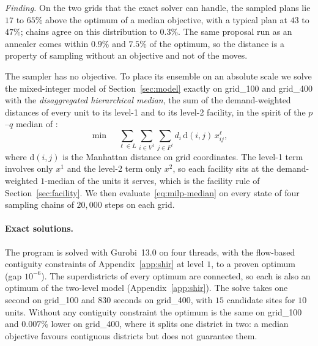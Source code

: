 \emph{Finding.} On the two grids that the exact solver can handle, the sampled plans lie $17$ to $65\%$ above the optimum of a median objective, with a typical plan at $43$ to $47\%$; chains agree on this distribution to $0.3\%$. The same proposal run as an annealer comes within $0.9\%$ and $7.5\%$ of the optimum, so the distance is a property of sampling without an objective and not of the moves.

The sampler has no objective. To place its ensemble on an absolute scale we solve the mixed-integer model of Section~\ref{sec:model} exactly on grid\_100 and grid\_400 with the \emph{disaggregated hierarchical median}, the sum of the demand-weighted distances of every unit to its level-1 and to its level-2 facility, in the spirit of the $p$--$q$ median of \citet{serra1993pq}:
\begin{equation}\label{eq:milp-median}
  \min \quad \sum_{\ell \in L} \sum_{i \in V^1} \sum_{j \in F^\ell} d_i \, \mathrm{d}(i, j) \, x^\ell_{ij},
\end{equation}
where $\mathrm{d}(i,j)$ is the Manhattan distance on grid coordinates. The level-1 term involves only $x^1$ and the level-2 term only $x^2$, so each facility sits at the demand-weighted $1$-median of the units it serves, which is the facility rule of Section~\ref{sec:facility}. We then evaluate~\eqref{eq:milp-median} on every state of four sampling chains of $20{,}000$ steps on each grid.

\paragraph{Exact solutions.}
The program is solved with Gurobi~13.0 on four threads, with the flow-based contiguity constraints of Appendix~\ref{app:shir} at level $1$, to a proven optimum (gap $10^{-6}$). The superdistricts of every optimum are connected, so each is also an optimum of the two-level model (Appendix~\ref{app:shir}). The solve takes one second on grid\_100 and $830$ seconds on grid\_400, with $15$ candidate sites for $10$ units. Without any contiguity constraint the optimum is the same on grid\_100 and $0.007\%$ lower on grid\_400, where it splits one district in two: a median objective favours contiguous districts but does not guarantee them.

\begin{table}[!htbp]
\centering
\small

\caption{The sampled ensemble against the exact optimum of objective~\eqref{eq:milp-median}. The ensemble columns are quantiles of the objective over the post-burn-in states of four chains of $20{,}000$ steps, relative to the optimum. ``Annealed'' is the best state of eight annealing runs of $10{,}000$ steps with the same proposal.}
\label{tab:milp}
\end{table}

